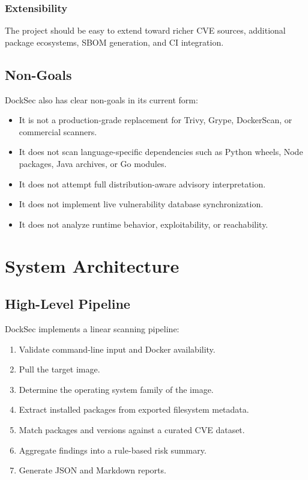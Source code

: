 \documentclass[12pt,draftclsnofoot,onecolumn]{IEEEtran}
\begin{document}
\subsubsection{Extensibility}
The project should be easy to extend toward richer CVE sources, additional package ecosystems, SBOM generation, and CI integration.

\subsection{Non-Goals}
DockSec also has clear non-goals in its current form:
\begin{itemize}
  \item It is not a production-grade replacement for Trivy, Grype, DockerScan, or commercial scanners.
  \item It does not scan language-specific dependencies such as Python wheels, Node packages, Java archives, or Go modules.
  \item It does not attempt full distribution-aware advisory interpretation.
  \item It does not implement live vulnerability database synchronization.
  \item It does not analyze runtime behavior, exploitability, or reachability.
\end{itemize}

\section{System Architecture}
\subsection{High-Level Pipeline}
DockSec implements a linear scanning pipeline:

\begin{enumerate}
  \item Validate command-line input and Docker availability.
  \item Pull the target image.
  \item Determine the operating system family of the image.
  \item Extract installed packages from exported filesystem metadata.
  \item Match packages and versions against a curated CVE dataset.
  \item Aggregate findings into a rule-based risk summary.
  \item Generate JSON and Markdown reports.
\end{enumerate}
\end{document}
